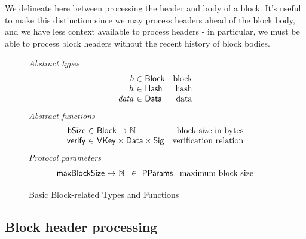 \documentclass[11pt,a4paper]{article}
\newcommand{\var}[1]{\mathit{#1}}
\newcommand{\fun}[1]{\mathsf{#1}}
\newcommand{\type}[1]{\mathsf{#1}}
\newcommand{\pp}[1]{\mathsf{#1}}
\newcommand{\totalf}{\to}
\newcommand{\partialf}{\mapsto}
\newcommand{\Hash}{\type{Hash}}  %
\newcommand{\Block}{\type{Block}}
\newcommand{\VKey}{\type{VKey}}
\newcommand{\Sig}{\type{Sig}}
\newcommand{\Data}{\type{Data}}
\newcommand{\ProtParams}{\type{PParams}} %
\newcommand{\bsizename}{bSize}
\newcommand{\verifyname}{verify}
\begin{document}
\newcommand{\bslotname}{bSlot}
\newcommand{\bslot}[1]{\fun{\bslotname}\ #1}

\newcommand{\butxo}[1]{\fun{bUtxo}\ #1}

\newcommand{\maxblocksize}{\pp{maxBlockSize}}
\newcommand{\maxheadersize}{\pp{maxHeaderSize}}

\newcommand{\UTxO}{\type{UTxO}}
\newcommand{\DIEnv}{\type{DIEnv}}
\newcommand{\DIState}{\type{DIState}}

We delineate here between processing the header and body of a block. It's useful
to make this distinction since we may process headers ahead of the
block body, and we have less context available to process headers - in
particular, we must be able to process block headers without the recent history
of block bodies.

\begin{figure}[ht]
  \emph{Abstract types}
  \begin{equation*}
    \begin{array}{r@{~\in~}lr}
      b & \Block & \text{block} \\
      h & \Hash   & \text{hash} \\
      \var{data} & \Data    & \text{data}
    \end{array}
  \end{equation*}
  \emph{Abstract functions}
  \begin{equation*}
    \begin{array}{r@{~\in~}lr}
      \fun{\bsizename} & \Block \totalf \mathbb{N} & \text{block size in bytes} \\
      \fun{\verifyname} & \VKey \times \Data \times \Sig & \text{verification relation} \\
    \end{array}
  \end{equation*}
  \emph{Protocol parameters}
  \begin{equation*}
    \begin{array}{r@{~\partialf~}l!{~\in~\ProtParams~}r}
      \maxblocksize & \mathbb{N} & \text{maximum block size} \\
    \end{array}
  \end{equation*}
  \caption{Basic Block-related Types and Functions}
  \label{fig:block-defs}
\end{figure}

\subsection{Block header processing}
\end{document}
